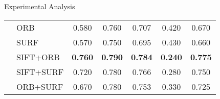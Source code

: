 \documentclass [9pt,times] {beamer}
\begin{document}
\begin{frame}{Experimental Analysis}
\begin{table}
\begin{tabular}{|c|l|c|c|c|c|c|}
    &    ORB    &    0.580    &    0.760    &    0.707    &    0.420    &    0.670    \\
    &    SURF    &    0.570    &    0.750    &    0.695    &    0.430    &    0.660    \\
    &    SIFT+ORB    &\textbf{    0.760    }&\textbf{    0.790    }&\textbf{    0.784    }&\textbf{    0.240    }&\textbf{    0.775    }\\
    &    SIFT+SURF    &    0.720    &    0.780    &    0.766    &    0.280    &    0.750    \\
    &    ORB+SURF    &    0.670    &    0.780    &    0.753    &    0.330    &    0.725    \\



\hline    
    \end{tabular}
\end{table}
\end{frame}
\end{document}
